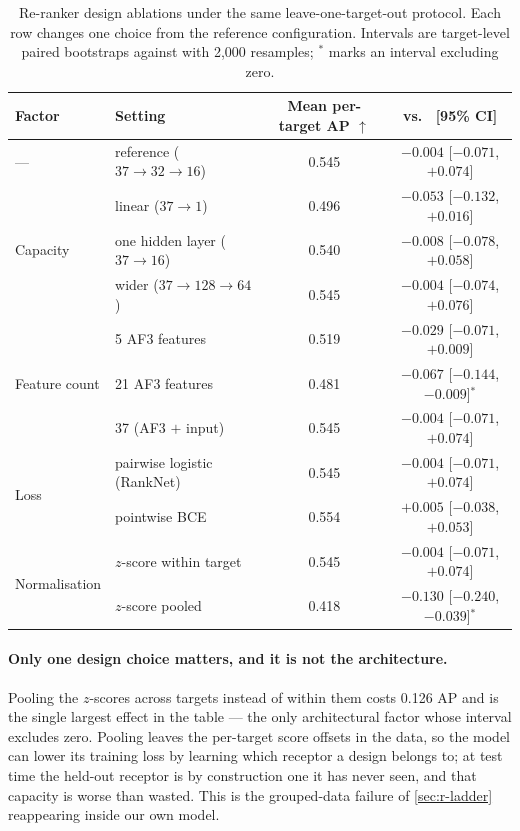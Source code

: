 \begin{table}[H]
  \centering
  \caption{Re-ranker design ablations under the same leave-one-target-out protocol. Each row
  changes one choice from the reference configuration. Intervals are target-level paired
  bootstraps against \ipsaemin{} with 2,000 resamples; $^{*}$ marks an interval excluding zero.}
  \label{tab:designablation}
  \small
  \begin{tabular}{llcc}
    \toprule
    Factor & Setting & Mean per-target AP $\uparrow$ & \dAP{} vs.\ \ipsaemin{} [95\% CI]\\
    \midrule
    --- & reference ($37\rightarrow32\rightarrow16$) & 0.545 & $-0.004$ [$-0.071$, $+0.074$]\\
    \midrule
    \multirow{3}{*}{Capacity}
      & linear ($37\rightarrow1$)               & 0.496 & $-0.053$ [$-0.132$, $+0.016$]\\
      & one hidden layer ($37\rightarrow16$)    & 0.540 & $-0.008$ [$-0.078$, $+0.058$]\\
      & wider ($37\rightarrow128\rightarrow64$) & 0.545 & $-0.004$ [$-0.074$, $+0.076$]\\
    \midrule
    \multirow{3}{*}{Feature count}
      & 5 AF3 features     & 0.519 & $-0.029$ [$-0.071$, $+0.009$]\\
      & 21 AF3 features    & 0.481 & $-0.067$ [$-0.144$, $-0.009$]$^{*}$\\
      & 37 (AF3 $+$ input) & 0.545 & $-0.004$ [$-0.071$, $+0.074$]\\
    \midrule
    \multirow{2}{*}{Loss}
      & pairwise logistic (RankNet) & 0.545 & $-0.004$ [$-0.071$, $+0.074$]\\
      & pointwise BCE               & 0.554 & $+0.005$ [$-0.038$, $+0.053$]\\
    \midrule
    \multirow{2}{*}{Normalisation}
      & $z$-score within target & 0.545 & $-0.004$ [$-0.071$, $+0.074$]\\
      & $z$-score pooled        & 0.418 & $-0.130$ [$-0.240$, $-0.039$]$^{*}$\\
    \bottomrule
  \end{tabular}
\end{table}

\paragraph{Only one design choice matters, and it is not the architecture.} Pooling the
$z$-scores across targets instead of within them costs 0.126 AP and is the single largest effect
in the table --- the only architectural factor whose interval excludes zero. Pooling leaves the
per-target score offsets in the data, so the model can lower its training loss by learning which
receptor a design belongs to; at test time the held-out receptor is by construction one it has
never seen, and that capacity is worse than wasted. This is the grouped-data failure of
\cref{sec:r-ladder} reappearing inside our own model.

